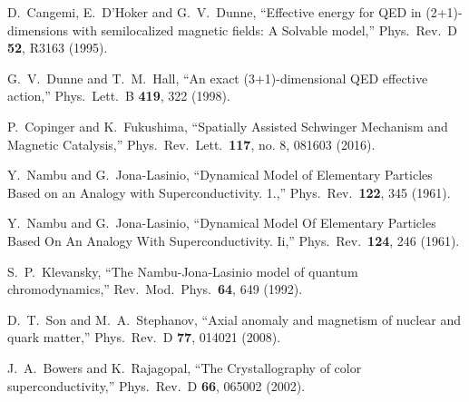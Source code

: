 \documentclass[aps,prd,amsmath,two column,amssymb,showpacs]{revtex4}
\begin{document}
\begin{thebibliography}{99}
D.~Cangemi, E.~D'Hoker and G.~V.~Dunne,
``Effective energy for QED in (2+1)-dimensions with semilocalized magnetic fields: A Solvable model,''
Phys.\ Rev.\ D {\bf 52}, R3163 (1995).%

G.~V.~Dunne and T.~M.~Hall,
``An exact (3+1)-dimensional QED effective action,''
Phys.\ Lett.\ B {\bf 419}, 322 (1998).%


P.~Copinger and K.~Fukushima,
``Spatially Assisted Schwinger Mechanism and Magnetic Catalysis,''
Phys.\ Rev.\ Lett.\  {\bf 117}, no. 8, 081603 (2016).%

Y.~Nambu and G.~Jona-Lasinio,
``Dynamical Model of Elementary Particles Based on an Analogy with Superconductivity. 1.,''
Phys.\ Rev.\  {\bf 122}, 345 (1961).

Y.~Nambu and G.~Jona-Lasinio,
``Dynamical Model Of Elementary Particles Based On An Analogy With Superconductivity. Ii,''
Phys.\ Rev.\  {\bf 124}, 246 (1961).

S.~P.~Klevansky,
``The Nambu-Jona-Lasinio model of quantum chromodynamics,''
Rev.\ Mod.\ Phys.\  {\bf 64}, 649 (1992).

D.~T.~Son and M.~A.~Stephanov,
``Axial anomaly and magnetism of nuclear and quark matter,''
Phys.\ Rev.\ D {\bf 77}, 014021 (2008).%

J.~A.~Bowers and K.~Rajagopal,
``The Crystallography of color superconductivity,''
Phys.\ Rev.\ D {\bf 66}, 065002 (2002).%


\end{thebibliography}
\end{document}
